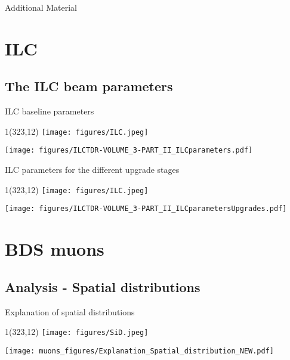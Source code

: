 \documentclass[xcolor={dvipsnames}]{beamer}
\newcommand{\sidlogo}{
  \setlength{\TPHorizModule}{1pt}
  \setlength{\TPVertModule}{1pt}
  \begin{textblock}{1}(323,12)
   \texttt{[image: figures/SiD.jpeg]}
  \end{textblock}
  }
\newcommand{\ilclogo}{
  \setlength{\TPHorizModule}{1pt}
  \setlength{\TPVertModule}{1pt}
  \begin{textblock}{1}(323,12)
   \texttt{[image: figures/ILC.jpeg]}
  \end{textblock}
}
\begin{document}
\appendix

\begin{frame}
\begin{center}
\LARGE Additional Material
\end{center}
  \tableofcontents
\end{frame}

\section{ILC}

\subsection{The ILC beam parameters}
\begin{frame}{ILC baseline parameters}
\ilclogo
\begin{center}
	\texttt{[image: figures/ILCTDR-VOLUME\_3-PART\_II\_ILCparameters.pdf]}
\end{center}
\end{frame}
\begin{frame}{ILC parameters for the different upgrade stages}
\ilclogo
\begin{center}
	\texttt{[image: figures/ILCTDR-VOLUME\_3-PART\_II\_ILCparametersUpgrades.pdf]}
\end{center}
\end{frame}

\section{BDS muons}
\subsection{Analysis - Spatial distributions}
\begin{frame}{Explanation of spatial distributions}
\sidlogo
 \begin{center}
\texttt{[image: muons\_figures/Explanation\_Spatial\_distribution\_NEW.pdf]}
\end{center}
\end{frame}
\end{document}
